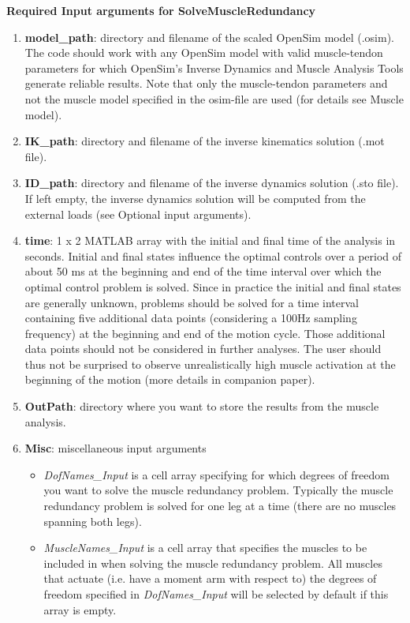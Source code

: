 \documentclass[a4paper,oneside,11pt]{article}
\begin{document}
\textbf{Required Input arguments for SolveMuscleRedundancy
}\begin{enumerate}
	\item \textbf{model_path}: directory and filename of the scaled OpenSim model (.osim). The code should work with any OpenSim model with valid muscle-tendon parameters for which OpenSim's Inverse Dynamics and Muscle Analysis Tools generate reliable results. Note that only the muscle-tendon parameters and not the muscle model specified in the osim-file are used (for details see Muscle model).
	\item \textbf{IK_path}: directory and filename of the inverse kinematics solution (.mot file).
	\item \textbf{ID_path}: directory and filename of the inverse dynamics solution  (.sto file). If left empty, the inverse dynamics solution will be computed from the external loads (see Optional input arguments).
	\item \textbf{time}: 1 x 2 MATLAB array with the initial and final time of the analysis in seconds. Initial and final states influence the optimal controls over a period of about 50 ms at the beginning and end of the time interval over which the optimal control problem is solved. Since in practice the initial and final states are generally unknown, problems should be solved for a time interval containing five additional data points (considering a 100Hz sampling frequency) at the beginning and end of the motion cycle. Those additional data points should not be considered in further analyses. The user should thus not be surprised to observe unrealistically high muscle activation at the beginning of the motion (more details in companion paper).
	
	\item \textbf{OutPath}: directory where you want to store the results from the muscle analysis.
	\item \textbf{Misc}: miscellaneous input arguments
	\begin{itemize}
		\item \textit{DofNames_Input}  is a cell array specifying for which degrees of freedom you want to solve the muscle redundancy problem. Typically the muscle redundancy problem is solved for one leg at a time (there are no muscles spanning both legs).
		\item \textit{MuscleNames_Input} is a cell array that specifies the muscles to be included in when solving the muscle redundancy problem. All muscles that actuate (i.e. have a moment arm with respect to) the degrees of freedom specified in \textit{DofNames_Input} will be selected by default if this array is empty.
	\end{itemize}
\end{enumerate}
\end{document}
